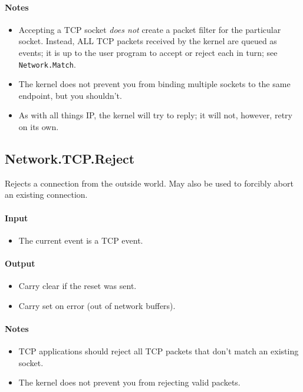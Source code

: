 \paragraph{Notes}
\begin{itemize}
\item Accepting a TCP socket {\em does not} create a packet filter for the particular socket.  Instead, ALL TCP packets received by the kernel are queued as events; it is up to the user program to accept or reject each in turn; see \verb+Network.Match+.
\item The kernel does not prevent you from binding multiple sockets to the same endpoint, but you shouldn't.
\item As with all things IP, the kernel will try to reply; it will not, however, retry on its own.
\end{itemize}

\subsection*{Network.TCP.Reject}
Rejects a connection from the outside world.  May also be used to forcibly abort an existing connection.

\paragraph{Input}
\begin{itemize}
\item The current event is a TCP event.
\end{itemize}

\paragraph{Output}
\begin{itemize}
\item Carry clear if the reset was sent.
\item Carry set on error (out of network buffers).
\end{itemize}

\paragraph{Notes}
\begin{itemize}
\item TCP applications should reject all TCP packets that don't match an existing socket. 
\item The kernel does not prevent you from rejecting valid packets.
\end{itemize}


